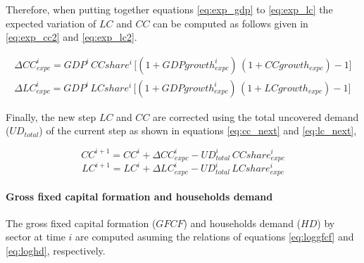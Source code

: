 Therefore, when putting together equations \eqref{eq:exp_gdp} to \eqref{eq:exp_lc} the expected variation of $LC$ and $CC$ can be computed as follows given in \eqref{eq:exp_cc2} and \eqref{eq:exp_lc2}.

\begin{gather}
\Delta CC_{expc}^i = GDP^i\,CCshare^i\,\Big[\left(1+GDPgrowth^{i}_{expc}\right)\,\left(1+CCgrowth_{expc}\right)-1\Big]\label{eq:exp_cc2}\\
\Delta LC_{expc}^i = GDP^i\,LCshare^i\,\Big[\left(1+GDPgrowth^{i}_{expc}\right)\,\left(1+LCgrowth_{expc}\right)-1\Big]\label{eq:exp_lc2}
\end{gather}

Finally, the new step $LC$ and $CC$ are corrected using the total uncovered demand ($UD_{total}$) of the current step as shown in equations \eqref{eq:cc_next} and \eqref{eq:lc_next},

    \begin{equation}
    CC^{i+1} = CC^i+\Delta CC_{expc}^i-UD_{total}^i\,CCshare_{expc}^i\label{eq:cc_next}
    \end{equation}
    \begin{equation}
    LC^{i+1} = LC^i+\Delta LC_{expc}^i-UD_{total}^i\,LCshare_{expc}^i\label{eq:lc_next}
    \end{equation}


\paragraph{Gross fixed capital formation and households demand}
\label{par:gfcf_hd}

The gross fixed capital formation ($GFCF$) and households demand ($HD$) by sector at time $i$ are computed asuming the relations of equations \eqref{eq:loggfcf} and \eqref{eq:loghd}, respectively.

